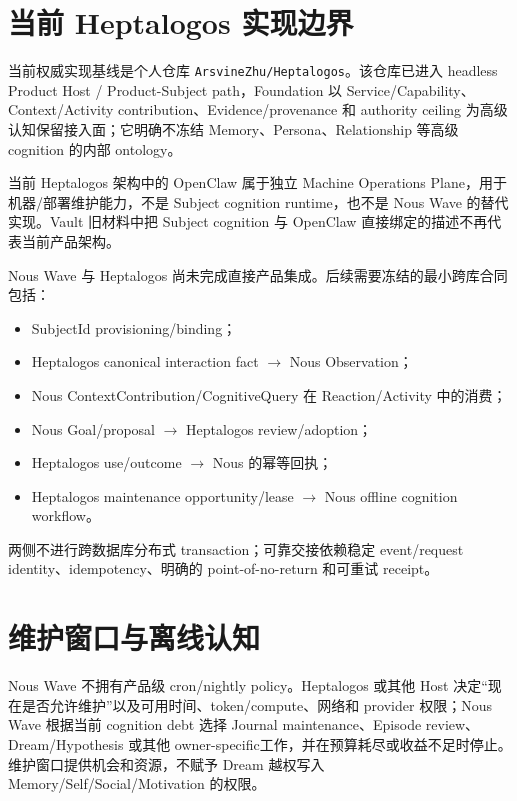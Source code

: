 \section{当前 Heptalogos 实现边界}

当前权威实现基线是个人仓库 \texttt{ArsvineZhu/Heptalogos}。该仓库已进入 headless Product Host / Product-Subject path，Foundation 以 Service/Capability、Context/Activity contribution、Evidence/provenance 和 authority ceiling 为高级认知保留接入面；它明确不冻结 Memory、Persona、Relationship 等高级 cognition 的内部 ontology。\cite{heptalogos-code-snapshot}

当前 Heptalogos 架构中的 OpenClaw 属于独立 Machine Operations Plane，用于机器/部署维护能力，不是 Subject cognition runtime，也不是 Nous Wave 的替代实现。Vault 旧材料中把 Subject cognition 与 OpenClaw 直接绑定的描述不再代表当前产品架构。

Nous Wave 与 Heptalogos 尚未完成直接产品集成。后续需要冻结的最小跨库合同包括：

\begin{itemize}
\item SubjectId provisioning/binding；
\item Heptalogos canonical interaction fact $\rightarrow$ Nous Observation；
\item Nous ContextContribution/CognitiveQuery 在 Reaction/Activity 中的消费；
\item Nous Goal/proposal $\rightarrow$ Heptalogos review/adoption；
\item Heptalogos use/outcome $\rightarrow$ Nous 的幂等回执；
\item Heptalogos maintenance opportunity/lease $\rightarrow$ Nous offline cognition workflow。
\end{itemize}

两侧不进行跨数据库分布式 transaction；可靠交接依赖稳定 event/request identity、idempotency、明确的 point-of-no-return 和可重试 receipt。

\section{维护窗口与离线认知}

Nous Wave 不拥有产品级 cron/nightly policy。Heptalogos 或其他 Host 决定“现在是否允许维护”以及可用时间、token/compute、网络和 provider 权限；Nous Wave 根据当前 cognition debt 选择 Journal maintenance、Episode review、Dream/Hypothesis 或其他 owner-specific工作，并在预算耗尽或收益不足时停止。维护窗口提供机会和资源，不赋予 Dream 越权写入 Memory/Self/Social/Motivation 的权限。


